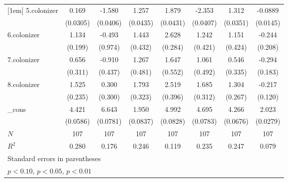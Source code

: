 {\begin{tabular}{l*{7}{c}}
[1em]
5.colonizer &       0.169\sym{***}&      -1.580\sym{***}&       1.257\sym{***}&       1.879\sym{***}&      -2.353\sym{***}&       1.312\sym{***}&     -0.0889\sym{***}\\
            &    (0.0305)         &    (0.0406)         &    (0.0435)         &    (0.0431)         &    (0.0407)         &    (0.0351)         &    (0.0145)         \\
[1em]
6.colonizer &       1.134\sym{***}&      -0.493         &       1.443\sym{***}&       2.628\sym{***}&       1.242\sym{***}&       1.151\sym{***}&      -0.244         \\
            &     (0.199)         &     (0.974)         &     (0.432)         &     (0.284)         &     (0.421)         &     (0.424)         &     (0.208)         \\
[1em]
7.colonizer &       0.656\sym{**} &      -0.910\sym{**} &       1.267\sym{***}&       1.647\sym{***}&       1.061\sym{**} &       0.546         &      -0.294         \\
            &     (0.311)         &     (0.437)         &     (0.481)         &     (0.552)         &     (0.492)         &     (0.335)         &     (0.183)         \\
[1em]
8.colonizer &       1.525\sym{***}&       0.300         &       1.793\sym{***}&       2.519\sym{***}&       1.685\sym{***}&       1.304\sym{***}&      -0.217\sym{*}  \\
            &     (0.235)         &     (0.300)         &     (0.323)         &     (0.396)         &     (0.312)         &     (0.267)         &     (0.120)         \\
[1em]
\_cons      &       4.421\sym{***}&       6.643\sym{***}&       1.950\sym{***}&       4.992\sym{***}&       4.695\sym{***}&       4.266\sym{***}&       2.023\sym{***}\\
            &    (0.0586)         &    (0.0781)         &    (0.0837)         &    (0.0828)         &    (0.0783)         &    (0.0676)         &    (0.0279)         \\
\hline
\(N\)       &         107         &         107         &         107         &         107         &         107         &         107         &         107         \\
\(R^{2}\)   &       0.280         &       0.176         &       0.246         &       0.119         &       0.235         &       0.247         &       0.079         \\
\hline\hline
\multicolumn{8}{l}{\footnotesize Standard errors in parentheses}\\
\multicolumn{8}{l}{\footnotesize \sym{*} \(p<0.10\), \sym{**} \(p<0.05\), \sym{***} \(p<0.01\)}\\
\end{tabular}
}
